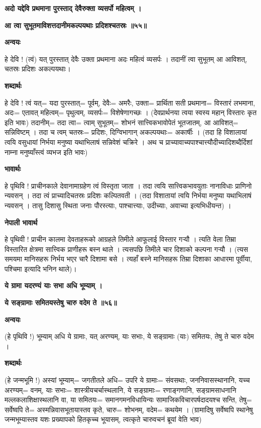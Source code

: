 \documentclass[11pt, a5paper]{article}
\begin{document}
\textbf{अदो यद्देवि प्रथमाना पुरस्ताद् देवैरुक्ता व्यसर्पो महित्वम् ।}

\textbf{आ त्वा सुभूतमाविशत्तदानीमकल्पयथाः प्रदिशश्चतस्रः ॥५५॥}

\textbf{अन्वयः}

हे देवि ! (त्वं) यत् पुरस्तात् देवैः उक्ता प्रथमाना अदः महित्वं व्यसर्पः । तदानीं त्वा सुभूतम् आ आविशत्, चतस्रः प्रदिशः अकल्पयथाः।

\textbf{शब्दार्थः}

हे देवि ! त्वं यत्= यदा पुरस्तात्= पूर्वम्, देवैः= अमरैः, उक्ता= प्रार्थिता सती प्रथमाना= विस्तारं लभमाना, अदः= एतावत् महित्वम्= पृथुत्वम्, व्यसर्पः= विशेषेणागच्छः । (देवप्रार्थनया त्वया स्वस्य महान् विस्तारः कृत इति भावः) तदानीम्= तदा त्वा= त्वाम् सुभूतम्= शोभनं सात्त्विकभावोपेतं भूतजातम्, आ आविशत्= सन्निविष्टम् । तदा च त्वम् चतस्रः= प्रदिशः, दिग्विभागान् अकल्पयथाः= अकार्षीः । (तदा हि विशालायां त्वयि वसुधायां निर्भया मनुष्या यथाभिलाषं सन्निवेशं चक्रिरे । अथ च प्राच्यावाच्यपाश्चात्त्यौदीच्यादिशब्दैर्दिशां नाम्ना मनुष्याँस्त्वं व्यभज इति भावः)

\textbf{भावार्थः}

हे पृथिवि ! प्राचीनकाले देवानामाग्रहेण त्वं विस्तृता जाता । तदा त्वयि सात्त्विकभावयुताः नानाविधाः प्राणिनो न्यवसन् । तदा त्वं प्राच्यादिचतस्रः प्रदिशः कल्पितवती । (तदा विशातायां त्वयि निर्भया मनुष्या यथाभिलाषं न्यवसन् । तासु दिशासु स्थिता जनाः पौरस्त्याः, पाश्चात्त्याः, उदीच्याः, अवाच्या इत्यभिधीयन्त) ।

\textbf{नेपाली भावार्थ}

हे पृथिवी ! प्राचीन कालमा देवताहरूको आग्रहले तिमीले आफूलाई विस्तार गर्‍यौ । त्यति वेला तिम्रा विस्तारित क्षेत्रमा सात्त्विक प्राणीहरू बस्न थाले । त्यसपछि तिमीले चार दिशाको कल्पना गर्‍यौ । (त्यस समयमा मानिसहरू निर्भय भएर चारै दिशामा बसे । त्यहाँ बस्ने मानिसहरू तिम्रा दिशाका आधारमा पूर्वीया, पश्चिमा इत्यादि भनिन थाले)।

\textbf{ये ग्रामा यदरण्यं याः सभा अधि भूम्याम् ।}

\textbf{ये सङ्‍ग्रामाः समितयस्तेषु चारु वदेम ते ॥५६॥}

\textbf{अन्वयः}

(हे पृथिवि !) भूम्याम् अधि ये ग्रामाः, यत् अरण्यम्, याः सभाः, ये सङ्‍ग्रामाः (याः) समितयः, तेषु ते चारु वदेम ।

\textbf{शब्दार्थः}

(हे जन्मभूमि !) अस्यां भूम्याम्= जगतीतले अधि= उपरि ये ग्रामाः= संवसथाः, जननिवासस्थानानि, यच्च अरण्यम्= वनम्, याः सभाः= शास्त्रीयचर्चास्थलानि, ये सङ्‍ग्रामाः= रणाङ्‍गणानि, सङ्‍ग्रामसाधनानि मल्लकलाशिक्षास्थलानि वा, या समितयः= समानगमनविधायिन्यः सामाजिकविचारपर्षदादयश्च सन्ति, तेषु= सर्वेष्वपि ते= अस्मन्निवासभूतायास्तव कृते, चारु= शोभनम्, वदेम= कथयेम । (ग्रामादिषु सर्वेष्वपि स्थानेषु जन्मभूम्यास्तव यशः प्रख्यापको हितकृच्च भूयासम्,  त्वत्कृते चारुवचनं ब्रूयां वेति भाव)
\end{document}
